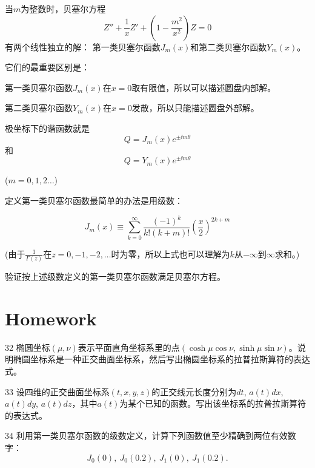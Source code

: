\documentclass[CJK]{beamer}
\begin{document}
\begin{frame}
  \bch
  当$m$为整数时，贝塞尔方程
  $$  Z'' + \frac{1}{x} Z' + (1-\frac{m^2}{x^2}) Z = 0$$
  有两个线性独立的解：
  {\blue 第一类贝塞尔函数$J_m(x)$和第二类贝塞尔函数$Y_m(x)$}。

  \skiplines
  
  它们的最重要区别是：
  \bitem
\item{ 第一类贝塞尔函数$J_m(x)$在$x=0$取有限值，所以可以描述圆盘内部解。}
\item{ 第二类贝塞尔函数$Y_m(x)$在$x=0$发散，所以只能描述圆盘外部解。}  
  \eitem
  \ech
\end{frame}

\begin{frame}
  \bch
  极坐标下的谐函数就是
  $$ Q = J_m(x)e^{\pm \ii m\theta} $$
  和
  $$ Q = Y_m(x)e^{\pm \ii m\theta} $$

  ($m=0,1,2\ldots$)
  \ech
\end{frame}

\begin{frame}
  \bch
  定义第一类贝塞尔函数最简单的办法是用级数：

  $$J_m(x) \equiv\sum_{k=0}^\infty\frac{(-1)^k}{k!(k+m)!} \left(\frac{x}{2}\right)^{2k+m}$$


  \skiplines

  (由于$\frac{1}{\Gamma(z)}$在$z=0,-1,-2,\dots$时为零，所以上式也可以理解为$k$从$-\infty$到$\infty$求和。)
  \ech
\end{frame}


\begin{frame}
  \bch

  
  验证按上述级数定义的第一类贝塞尔函数满足贝塞尔方程。
  \ech
\end{frame}


\section{Homework}

\begin{frame}
  \bch
  \bitem
\item[32]{椭圆坐标$(\mu,\nu)$表示平面直角坐标系里的点$(\cosh \mu \cos\nu, \sinh\mu\sin\nu)$。说明椭圆坐标系是一种正交曲面坐标系，然后写出椭圆坐标系的拉普拉斯算符的表达式。}
\item[33]{设四维的正交曲面坐标系$(t,x,y,z)$的正交线元长度分别为$dt$, $a(t)dx$, $a(t)dy$, $a(t)dz$，其中$a(t)$为某个已知的函数。写出该坐标系的拉普拉斯算符的表达式。}
\item[34]{利用第一类贝塞尔函数的级数定义，计算下列函数值至少精确到两位有效数字：
  $$J_0(0),\ J_0(0.2),\ J_1(0),\ J_1(0.2).$$}
  \eitem
  \ech
\end{frame}
\end{document}
